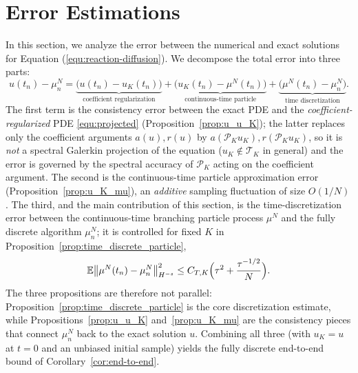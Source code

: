 \documentclass[a4paper,fleqn]{cas-sc}
\theoremstyle{definition}
\theoremstyle{remark}
\begin{document}
\section{Error Estimations}
In this section, we analyze the error between the numerical and exact solutions for Equation (\ref{equ:reaction-diffusion}). 
We decompose the total error into three parts:
\begin{equation}\label{eq:err-decomp}
u(t_n)-\mu_n^N
=\underbrace{\bigl(u(t_n)-u_K(t_n)\bigr)}_{\text{coefficient regularization}}
+\underbrace{\bigl(u_K(t_n)-\mu^N(t_n)\bigr)}_{\text{continuous-time particle}}
+\underbrace{\bigl(\mu^N(t_n)-\mu_n^N\bigr)}_{\text{time discretization}}.
\end{equation}
The first term is the consistency error between the exact PDE and the
\emph{coefficient-regularized} PDE \eqref{equ:projected} (Proposition~\ref{prop:u_u_K});
the latter replaces only the coefficient arguments $a(u),r(u)$ by
$a(\mathcal P_K u_K),r(\mathcal P_K u_K)$, so it is \emph{not} a spectral Galerkin
projection of the equation ($u_K\notin\mathcal T_K$ in general) and the error is
governed by the spectral accuracy of $\mathcal P_K$ acting on the coefficient
argument. The second is the
continuous-time particle approximation error (Proposition~\ref{prop:u_K_mu}), an
\emph{additive} sampling fluctuation of size $O(1/N)$. The third, and the main
contribution of this section, is the time-discretization error between the
continuous-time branching particle process $\mu^N$ and the fully discrete
algorithm $\mu^N_n$; it is controlled for fixed $K$ in
Proposition~\ref{prop:time_discrete_particle},
\[
\mathbb E\bigl\|\mu^N(t_n)-\mu^N_n\bigr\|_{H^{-s}}^2
\le C_{T,K}\Bigl(\tau^2+\frac{\tau^{-1/2}}{N}\Bigr).
\]
The three propositions are therefore not parallel:
Proposition~\ref{prop:time_discrete_particle} is the core discretization estimate,
while Propositions~\ref{prop:u_u_K} and~\ref{prop:u_K_mu} are the consistency pieces
that connect $\mu^N_n$ back to the exact solution $u$. Combining all three (with
$u_K=u$ at $t=0$ and an unbiased initial sample) yields the fully discrete
end-to-end bound of Corollary~\ref{cor:end-to-end}.
\end{document}
